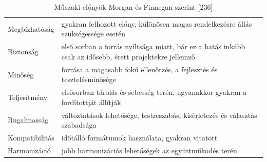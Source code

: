 \documentclass[12pt,magyar,a4paper,oneside]{scrreprt}
\begin{document}
\hypertarget{tbl:Elux151ny}{}
\begin{longtable}[]{@{}ll@{}}
\caption{\label{tbl:Elux151ny}Műszaki előnyök Morgan és Finnegan szerint
{[}236{]}}\tabularnewline
\toprule
\endhead
\begin{minipage}[t]{0.14\columnwidth}\raggedright
Megbízhatóság\strut
\end{minipage} & \begin{minipage}[t]{0.81\columnwidth}\raggedright
gyakran felhozott előny, különösen magas rendelkezésre állás
szükségessége esetén\strut
\end{minipage}\tabularnewline
\begin{minipage}[t]{0.14\columnwidth}\raggedright
Biztonság\strut
\end{minipage} & \begin{minipage}[t]{0.81\columnwidth}\raggedright
első sorban a forrás nyíltsága miatt, bár ez a hatás inkább csak az
idősebb, érett projektekre jellemző\strut
\end{minipage}\tabularnewline
\begin{minipage}[t]{0.14\columnwidth}\raggedright
Minőség\strut
\end{minipage} & \begin{minipage}[t]{0.81\columnwidth}\raggedright
forrása a magasabb fokú ellenőrzés, a fejlesztés és
tesztelésminősége\strut
\end{minipage}\tabularnewline
\begin{minipage}[t]{0.14\columnwidth}\raggedright
Teljesítmény\strut
\end{minipage} & \begin{minipage}[t]{0.81\columnwidth}\raggedright
elsősorban tárolás és sebesség terén, ugyanakkor gyakran a fordítottját
állítják\strut
\end{minipage}\tabularnewline
\begin{minipage}[t]{0.14\columnwidth}\raggedright
Rugalmasság\strut
\end{minipage} & \begin{minipage}[t]{0.81\columnwidth}\raggedright
változtatások lehetősége, testreszabás, kísérletezés és választás
szabadsága\strut
\end{minipage}\tabularnewline
\begin{minipage}[t]{0.14\columnwidth}\raggedright
Kompatibilitás\strut
\end{minipage} & \begin{minipage}[t]{0.81\columnwidth}\raggedright
időtálló formátumok használata, gyakran vitatott\strut
\end{minipage}\tabularnewline
\begin{minipage}[t]{0.14\columnwidth}\raggedright
Harmonizáció\strut
\end{minipage} & \begin{minipage}[t]{0.81\columnwidth}\raggedright
jobb harmonizációs lehetőségek az együttműködés terén\strut
\end{minipage}\tabularnewline
\bottomrule
\end{longtable}
\end{document}

